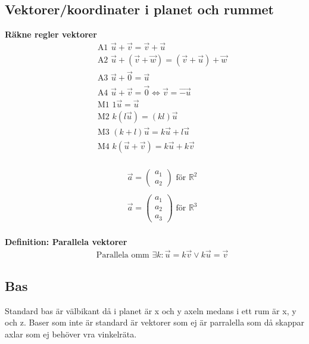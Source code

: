\begin{multicols}{2}
\section{Vektorer/koordinater i planet och rummet}
\textbf{Räkne regler vektorer}
\begin{align*}
  &\quad \text{A1 } \vec{u} + \vec{v} = \vec{v} + \vec{u} \\
  &\quad \text{A2 } \vec{u} + (\vec{v}+\vec{w}) = (\vec{v}+\vec{u}) + \vec{w} \\
  &\quad \text{A3 } \vec{u} + \vec{0} = \vec{u} \\
  &\quad \text{A4 } \vec{u} + \vec{v}  = \vec{0} \Leftrightarrow \vec{v} = \vec{-u} \\
  &\quad \text{M1 } 1\vec{u} = \vec{u} \\
  &\quad \text{M2 } k(l\vec{u}) = (kl)\vec{u} \\
  &\quad \text{M3 } (k+l)\vec{u} = k\vec{u} + l\vec{u} \\
  &\quad \text{M4 } k(\vec{u}+\vec{v}) = k\vec{u} + k\vec{v} \\
\end{align*}

\begin{align*}
  &\quad \vec{a} = \begin{pmatrix}
  a_1 \\
  a_2 
  \end{pmatrix} \text{ för } \mathbb{R}^2 \\
  &\quad \\
  &\quad \vec{a} = \begin{pmatrix}
  a_1 \\
  a_2 \\
  a_3
  \end{pmatrix} \text{ för } \mathbb{R}^3 \\
\end{align*}

\textbf{Definition: Parallela vektorer}
\begin{align*}
  &\quad \text{Parallela omm } \exists{k}: \vec{u} = k\vec{v} \lor k\vec{u} = \vec{v}
\end{align*}


\subsection{Bas}
Standard bas är välbikant då i planet är x och y axeln medans i ett rum är x, y och z.
Baser som inte är standard är vektorer som ej är parralella som då skappar axlar som ej
behöver vra vinkelräta. \newline


\end{multicols}
